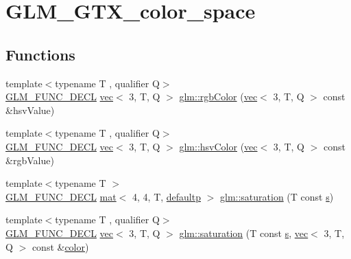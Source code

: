 \hypertarget{group__gtx__color__space}{}\section{G\+L\+M\+\_\+\+G\+T\+X\+\_\+color\+\_\+space}
\label{group__gtx__color__space}
\subsection*{Functions}
\begin{DoxyCompactItemize}
\item 
{\footnotesize template$<$typename T , qualifier Q$>$ }\\\hyperlink{setup_8hpp_ab2d052de21a70539923e9bcbf6e83a51}{G\+L\+M\+\_\+\+F\+U\+N\+C\+\_\+\+D\+E\+CL} \hyperlink{structglm_1_1vec}{vec}$<$ 3, T, Q $>$ \hyperlink{group__gtx__color__space_ga5f9193be46f45f0655c05a0cdca006db}{glm\+::rgb\+Color} (\hyperlink{structglm_1_1vec}{vec}$<$ 3, T, Q $>$ const \&hsv\+Value)
\item 
{\footnotesize template$<$typename T , qualifier Q$>$ }\\\hyperlink{setup_8hpp_ab2d052de21a70539923e9bcbf6e83a51}{G\+L\+M\+\_\+\+F\+U\+N\+C\+\_\+\+D\+E\+CL} \hyperlink{structglm_1_1vec}{vec}$<$ 3, T, Q $>$ \hyperlink{group__gtx__color__space_ga789802bec2d4fe0f9741c731b4a8a7d8}{glm\+::hsv\+Color} (\hyperlink{structglm_1_1vec}{vec}$<$ 3, T, Q $>$ const \&rgb\+Value)
\item 
{\footnotesize template$<$typename T $>$ }\\\hyperlink{setup_8hpp_ab2d052de21a70539923e9bcbf6e83a51}{G\+L\+M\+\_\+\+F\+U\+N\+C\+\_\+\+D\+E\+CL} \hyperlink{structglm_1_1mat}{mat}$<$ 4, 4, T, \hyperlink{namespaceglm_a36ed105b07c7746804d7fdc7cc90ff25a9d21ccd8b5a009ec7eb7677befc3bf51}{defaultp} $>$ \hyperlink{group__gtx__color__space_ga01a97152b44e1550edcac60bd849e884}{glm\+::saturation} (T const \hyperlink{_s_d_l__opengl_8h_a4af680a6c683f88ed67b76f207f2e6e4}{s})
\item 
{\footnotesize template$<$typename T , qualifier Q$>$ }\\\hyperlink{setup_8hpp_ab2d052de21a70539923e9bcbf6e83a51}{G\+L\+M\+\_\+\+F\+U\+N\+C\+\_\+\+D\+E\+CL} \hyperlink{structglm_1_1vec}{vec}$<$ 3, T, Q $>$ \hyperlink{group__gtx__color__space_ga2156cea600e90148ece5bc96fd6db43a}{glm\+::saturation} (T const \hyperlink{_s_d_l__opengl_8h_a4af680a6c683f88ed67b76f207f2e6e4}{s}, \hyperlink{structglm_1_1vec}{vec}$<$ 3, T, Q $>$ const \&\hyperlink{_s_d_l__opengl__glext_8h_a3ea846f998d64f079b86052b6c4193a8}{color})

\end{DoxyCompactItemize}
